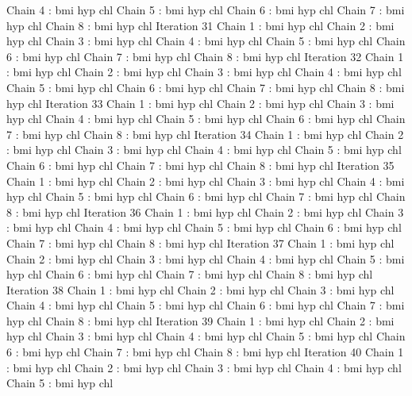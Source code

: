 \begin{Schunk}
\begin{Soutput}
 Chain 4 : bmi   hyp   chl   
 Chain 5 : bmi   hyp   chl   
 Chain 6 : bmi   hyp   chl   
 Chain 7 : bmi   hyp   chl   
 Chain 8 : bmi   hyp   chl   
Iteration 31 
 Chain 1 : bmi   hyp   chl   
 Chain 2 : bmi   hyp   chl   
 Chain 3 : bmi   hyp   chl   
 Chain 4 : bmi   hyp   chl   
 Chain 5 : bmi   hyp   chl   
 Chain 6 : bmi   hyp   chl   
 Chain 7 : bmi   hyp   chl   
 Chain 8 : bmi   hyp   chl   
Iteration 32 
 Chain 1 : bmi   hyp   chl   
 Chain 2 : bmi   hyp   chl   
 Chain 3 : bmi   hyp   chl   
 Chain 4 : bmi   hyp   chl   
 Chain 5 : bmi   hyp   chl   
 Chain 6 : bmi   hyp   chl   
 Chain 7 : bmi   hyp   chl   
 Chain 8 : bmi   hyp   chl   
Iteration 33 
 Chain 1 : bmi   hyp   chl   
 Chain 2 : bmi   hyp   chl   
 Chain 3 : bmi   hyp   chl   
 Chain 4 : bmi   hyp   chl   
 Chain 5 : bmi   hyp   chl   
 Chain 6 : bmi   hyp   chl   
 Chain 7 : bmi   hyp   chl   
 Chain 8 : bmi   hyp   chl   
Iteration 34 
 Chain 1 : bmi   hyp   chl   
 Chain 2 : bmi   hyp   chl   
 Chain 3 : bmi   hyp   chl   
 Chain 4 : bmi   hyp   chl   
 Chain 5 : bmi   hyp   chl   
 Chain 6 : bmi   hyp   chl   
 Chain 7 : bmi   hyp   chl   
 Chain 8 : bmi   hyp   chl   
Iteration 35 
 Chain 1 : bmi   hyp   chl   
 Chain 2 : bmi   hyp   chl   
 Chain 3 : bmi   hyp   chl   
 Chain 4 : bmi   hyp   chl   
 Chain 5 : bmi   hyp   chl   
 Chain 6 : bmi   hyp   chl   
 Chain 7 : bmi   hyp   chl   
 Chain 8 : bmi   hyp   chl   
Iteration 36 
 Chain 1 : bmi   hyp   chl   
 Chain 2 : bmi   hyp   chl   
 Chain 3 : bmi   hyp   chl   
 Chain 4 : bmi   hyp   chl   
 Chain 5 : bmi   hyp   chl   
 Chain 6 : bmi   hyp   chl   
 Chain 7 : bmi   hyp   chl   
 Chain 8 : bmi   hyp   chl   
Iteration 37 
 Chain 1 : bmi   hyp   chl   
 Chain 2 : bmi   hyp   chl   
 Chain 3 : bmi   hyp   chl   
 Chain 4 : bmi   hyp   chl   
 Chain 5 : bmi   hyp   chl   
 Chain 6 : bmi   hyp   chl   
 Chain 7 : bmi   hyp   chl   
 Chain 8 : bmi   hyp   chl   
Iteration 38 
 Chain 1 : bmi   hyp   chl   
 Chain 2 : bmi   hyp   chl   
 Chain 3 : bmi   hyp   chl   
 Chain 4 : bmi   hyp   chl   
 Chain 5 : bmi   hyp   chl   
 Chain 6 : bmi   hyp   chl   
 Chain 7 : bmi   hyp   chl   
 Chain 8 : bmi   hyp   chl   
Iteration 39 
 Chain 1 : bmi   hyp   chl   
 Chain 2 : bmi   hyp   chl   
 Chain 3 : bmi   hyp   chl   
 Chain 4 : bmi   hyp   chl   
 Chain 5 : bmi   hyp   chl   
 Chain 6 : bmi   hyp   chl   
 Chain 7 : bmi   hyp   chl   
 Chain 8 : bmi   hyp   chl   
Iteration 40 
 Chain 1 : bmi   hyp   chl   
 Chain 2 : bmi   hyp   chl   
 Chain 3 : bmi   hyp   chl   
 Chain 4 : bmi   hyp   chl   
 Chain 5 : bmi   hyp   chl   

\end{Soutput}
\end{Schunk}
